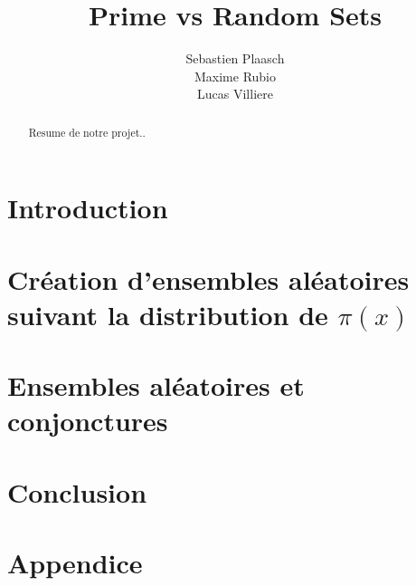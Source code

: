\documentclass{article}
\begin{document}
\author{Sebastien Plaasch \\ Maxime Rubio  \\ Lucas Villiere}
\title{Prime vs Random Sets}
\maketitle
\newpage 
\begin{abstract}
    Resume de notre projet..
\end{abstract}
\newpage
\tableofcontents


\newpage

\section{Introduction}
    \label{sec:intro}


\section{Création d'ensembles aléatoires suivant la distribution de $\pi(x)$}
    \label{sec:sec1}
    
    
    
		

\section{Ensembles aléatoires et conjonctures}
    
		
		
		
\section{Conclusion}

\clearpage
\appendix
	\section{Appendice}
		
		
\newpage
\printindex
\end{document}
